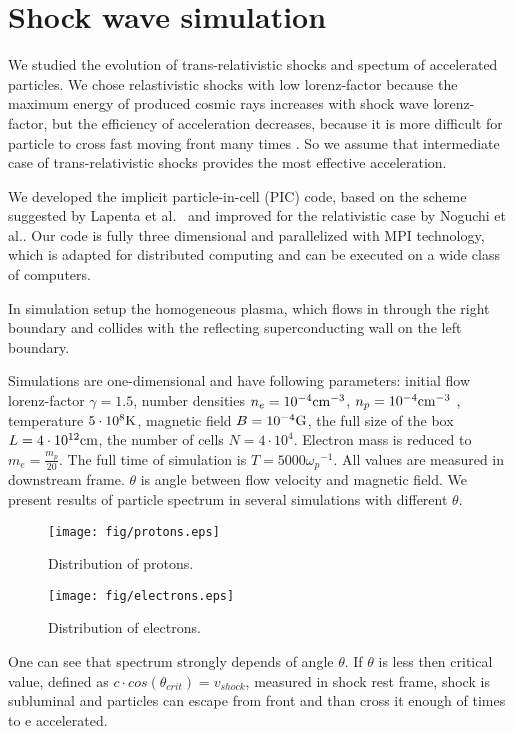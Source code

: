 \section{Shock wave simulation}
We studied the evolution of trans-relativistic shocks and spectum of accelerated particles. We chose relastivistic shocks with low lorenz-factor because the maximum energy of produced cosmic rays increases with shock wave lorenz-factor, but the efficiency of acceleration decreases, because it is more difficult for particle to cross fast moving front many times \cite{Ellison2013}. So we assume that intermediate case of trans-relativistic shocks provides the most effective acceleration.

We developed the implicit particle-in-cell (PIC) code, based on the scheme suggested by Lapenta et al.~\cite{Lapenta2006} and improved for the relativistic case by Noguchi et al.\cite{Noguchi2007}.
Our code is fully three dimensional and parallelized with MPI technology, which is adapted for distributed computing and can be executed on a wide class of computers.

In simulation setup the homogeneous plasma, which flows in through the right boundary
and collides with the reflecting superconducting wall on the left boundary. 
  
 Simulations are one-dimensional and have following parameters: initial flow lorenz-factor $\gamma = 1.5$, number densities $n_e = 10^{-4} \rm{cm}^{-3}$, $n_p = 10^{-4} \rm{cm}^{-3}$ , temperature $5\cdot10^8 \rm{K}$, magnetic field $B = 10^{-4} \rm{G}$, the full size of the box $L = 4\cdot10^{12} \rm{cm}$, the number of cells $N=4\cdot10^4$. Electron mass is reduced to $m_e = \frac{m_p}{20}$. The full time of simulation is $T = 5000 {\omega_p}^{-1}$. All values are measured in downstream frame. $\theta$ is angle between flow velocity and magnetic field. We present results of particle spectrum in several simulations with different $\theta$. 
\begin{figure}[h!]
	\centering
	\texttt{[image: fig/protons.eps]} 
	\caption{Distribution of protons.}
	\label{protons}
\end{figure}
\begin{figure}[h!]
	\centering
	\texttt{[image: fig/electrons.eps]} 
	\caption{Distribution of electrons.}
	\label{electrons}
\end{figure}

One can see that spectrum strongly depends of angle $\theta$. If $\theta$ is less then critical value, defined as $c\cdot cos(\theta_{crit})=v_{shock}$, measured in shock rest frame, shock is subluminal and particles can escape from front and than cross it enough of times to e accelerated.